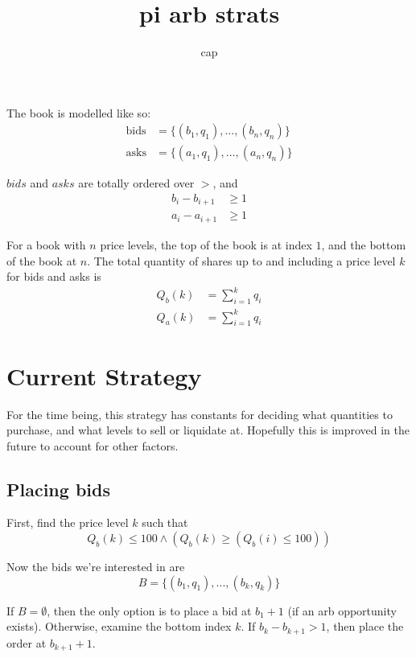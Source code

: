 \documentclass[12pt]{article}
\title{pi arb strats}
\author{cap}
\begin{document}
\maketitle

The book is modelled like so:
\begin{align*}
\text{bids} &= \{ (b_1, q_1), ..., (b_n, q_n) \}\\
\text{asks} &= \{ (a_1, q_1), ..., (a_n, q_n) \}
\end{align*}

$bids$ and $asks$ are totally ordered over $>$, and 
\begin{align*}
    b_i - b_{i+1} &\geq 1\\
    a_i - a_{i+1} &\geq 1
\end{align*}

For a book with $n$ price levels, the top of the book is at index $1$, and the bottom of the book at $n$.
The total quantity of shares up to and including a price level $k$ for bids and asks is
\begin{align*}
Q_b(k) &= \sum_{i=1}^{k} q_i\\
Q_a(k) &= \sum_{i=1}^{k} q_i
\end{align*}

\section*{Current Strategy}

For the time being, this strategy has constants for deciding what quantities to purchase, and what
levels to sell or liquidate at. Hopefully this is improved in the future to account for other factors.

\subsection*{Placing bids}

First, find the price level $k$ such that
\begin{equation}
    Q_b(k) \leq 100 \wedge (Q_b(k) \geq (Q_b(i) \leq 100))
\end{equation}

Now the bids we're interested in are
$$
B = \{ (b_1, q_1), ..., (b_k, q_k) \}
$$

If $ B = \emptyset $, then the only option is to place a bid at $b_1 + 1$ (if an arb opportunity exists).
Otherwise, examine the bottom index $k$. If $b_k - b_{k+1} > 1$, then place the order at $b_{k+1}+1$.
\end{document}
